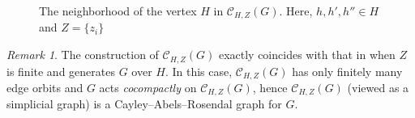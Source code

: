 \documentclass[twoside]{amsart}
\theoremstyle{plain}
\newtheorem{lemma}[theorem]{Lemma}
\theoremstyle{break}
\theoremstyle{definition}
\theoremstyle{remark}
\newtheorem{remark*}[theorem]{Remark}
\newcommand{\cc}{\mathcal C}
\begin{document}
\begin{figure}[h]
  \centering
  \caption{The neighborhood of the vertex $H$ in $\cc_{H,Z}(G)$.
  Here, $h,h',h'' \in H$ and $Z = \{z_i\}$}
  \label{fig:chz}
\end{figure}

\begin{remark*}\label{rmk:car_build}
  The construction of $\cc_{H,Z}(G)$ exactly coincides
with that in \cite[\S3]{bdhl} when $Z$ is finite 
and generates $G$ over $H$.   In this case,
  $\cc_{H,Z}(G)$ has only finitely many edge orbits
  and $G$ acts \textit{cocompactly} on $\cc_{H,Z}(G)$, hence
  $\cc_{H,Z}(G)$ (viewed as a simplicial graph) is a
  Cayley--Abels--Rosendal graph for $G$.  
\end{remark*}


\end{document}
